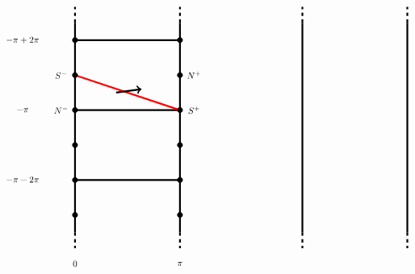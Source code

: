 \documentclass[11 pt]{article}
\renewcommand\({\left(}
\renewcommand\){\right)}
\newcommand\<{\langle}
\renewcommand\>{\rangle}
\newcommand\8{\infty}
\begin{document}
\begin{figure}[h]
\[
\begin{tikzpicture}[scale = 0.55]


\draw[ultra thick] (-3,-4) -- (-3, 8);
\draw[ultra thick] (3,-4) -- (3,8);

\draw[ultra thick, dashed] (-3,8) -- (-3,8.9);
\draw[ultra thick, dashed] (3,8) -- (3,8.9);
\draw[ultra thick, dashed] (-3,-4) -- (-3,-4.9);
\draw[ultra thick, dashed] (3,-4) -- (3,-4.9);

\draw[ultra thick] (-3,-1) -- (3,-1);
\draw[ultra thick] (-3,3) -- (3,3);
\draw[ultra thick] (-3,7) -- (3,7);


\draw[ultra thick, red] (-3,5) -- (3,3);


\draw[->, ultra thick] (-.65,4) -- (.8,4.2);




\node [scale = .50] [circle, draw, fill = black] at (-3,-1)  {};
\node [scale = .50] [circle, draw, fill = black] at (-3,1)  {};
\node [scale = .50] [circle, draw, fill = black] at (3,-1)  {};
\node [scale = .50] [circle, draw, fill = black] at (3,1)  {};

\node [scale = .50] [circle, draw, fill = black] at (-3,7)  {};
\node [scale = .50] [circle, draw, fill = black] at (-3,-3)  {};
\node [scale = .50] [circle, draw, fill = black] at (3,7)  {};
\node [scale = .50] [circle, draw, fill = black] at (3,-3)  {};

\node [scale = .50] [circle, draw, fill = black] at (-3,3)  {};
\node [scale = .50] [circle, draw, fill = black] at (-3,5)  {};
\node [scale = .50] [circle, draw, fill = black] at (3,3)  {};
\node [scale = .50] [circle, draw, fill = black] at (3,5)  {};


\draw (-3.8,5) node [scale = .8] {$S^-$};
\draw (-3.8,3) node [scale = .8] {$N^-$};
\draw (3.8,5) node [scale = .8] {$N^+$};
\draw (3.8,3) node [scale = .8] {$S^+$};

\draw (-3, -5.8) node [scale = .8] {$0$};
\draw (3, -5.8) node [scale = .8] {$\pi$};


\draw (-6,3) node [scale = .8] {$-\pi$};
\draw (-6,7) node [scale = .8] {$-\pi + 2\pi$};
\draw (-6,-1) node [scale = .8] {$-\pi -2\pi$};


\draw[ultra thick] (10,-4) -- (10, 8);
\draw[ultra thick] (16,-4) -- (16,8);

\draw[ultra thick, dashed] (10,8) -- (10,8.9);
\draw[ultra thick, dashed] (16,8) -- (16,8.9);
\draw[ultra thick, dashed] (10,-4) -- (10,-4.9);
\draw[ultra thick, dashed] (16,-4) -- (16,-4.9);


\end{tikzpicture}\]
\end{figure}
\end{document}
